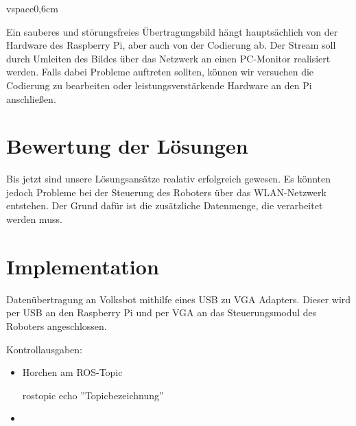 \documentclass[12pt]{article}
\begin{document}
vspace{0,6cm}

Ein sauberes und störungsfreies Übertragungsbild hängt hauptsächlich von der Hardware des Raspberry Pi, aber auch von der Codierung ab. Der Stream soll durch  Umleiten des Bildes über das Netzwerk an einen PC-Monitor realisiert werden. Falls dabei Probleme auftreten sollten, können wir versuchen die Codierung zu bearbeiten oder leistungsverstärkende Hardware an den Pi anschließen.




\section{Bewertung der Lösungen}

Bis jetzt sind unsere Lösungsansätze realativ erfolgreich gewesen. Es könnten jedoch Probleme bei der Steuerung des Roboters über das WLAN-Netzwerk entstehen. Der Grund dafür ist die zusätzliche Datenmenge, die verarbeitet werden muss. 

\section{Implementation}





Datenübertragung an Volksbot mithilfe eines USB zu VGA Adapters. Dieser wird per USB an den Raspberry Pi und per VGA an das Steuerungsmodul des Roboters angeschlossen.




Kontrollausgaben:
\begin{itemize}

\item Horchen am ROS-Topic

\subitem rostopic echo ''Topicbezeichnung''

\item 

\end{itemize}





\end{document}
